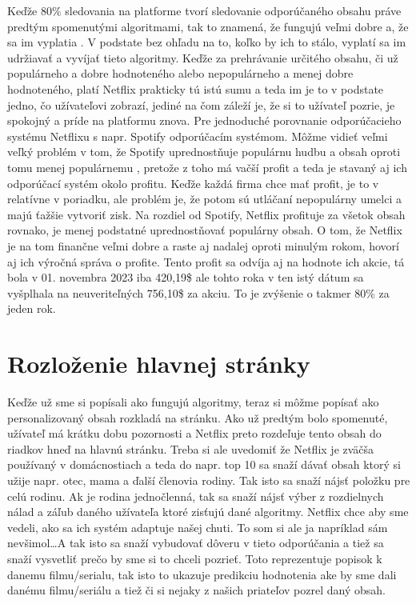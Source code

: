 \documentclass[10pt,twoside,slovak,a4paper]{article}
\begin{document}
Keďže 80\% sledovania na platforme tvorí sledovanie odporúčaného obsahu práve predtým spomenutými algoritmami, tak to znamená, že fungujú veľmi dobre a, že sa im vyplatia \cite{pub.1158091188}. V podstate bez ohľadu na to, koľko by ich to stálo, vyplatí sa im udržiavať a vyvíjať tieto algoritmy. Keďže za prehrávanie určitého obsahu, či už populárneho a dobre hodnoteného alebo nepopulárneho a menej dobre hodnoteného, platí Netflix prakticky tú istú sumu a teda im je to v podstate jedno, čo užívateľovi zobrazí, jediné na čom záleží je, že si to užívateľ pozrie, je spokojný a príde na platformu znova. \cite{amatriain2015recommender}
Pre jednoduché porovnanie odporúčacieho systému Netflixu s napr. Spotify odporúčacím systémom. Môžme vidieť veľmi veľký problém v tom, že Spotify uprednostňuje populárnu hudbu a obsah oproti tomu menej populárnemu , pretože z toho má vačší profit a teda je stavaný aj ich odporúčací systém okolo profitu\cite{10425661}. Keďže každá firma chce mať profit, je to v relatívne v poriadku, ale problém je, že potom sú utláčaní nepopulárny umelci a majú ťažšie vytvoriť zisk. Na rozdiel od Spotify, Netflix profituje za všetok obsah rovnako, je menej podstatné uprednostňovať populárny obsah. O tom, že Netflix je na tom finančne veľmi dobre a raste aj nadalej oproti minulým rokom, hovorí aj ich výročná správa o profite\cite{AnnualReportNetflix2023}. Tento profit sa odvíja aj na hodnote ich akcie, tá bola v 01. novembra 2023 iba 420,19\$ ale tohto roka v ten istý dátum sa vyšplhala na neuveriteľných 756,10\$ za akciu. To je zvýšenie o takmer 80\% za jeden rok.\cite{StockValueNetflix}

\section{Rozloženie hlavnej stránky} \label{Rozloženie}
Keďže už sme si popísali ako fungujú algoritmy, teraz si môžme popísať ako personalizovaný obsah rozkladá na stránku. Ako už predtým bolo spomenuté, užívateľ má krátku dobu pozornosti a Netflix preto rozdeľuje tento obsah do riadkov hneď na hlavnú stránku. Treba si ale uvedomiť že Netflix je zväčša používaný v domácnostiach a teda do napr. top 10 sa snaží dávať obsah ktorý si užije napr. otec, mama a ďalší členovia rodiny. Tak isto sa snaží nájsť položku pre celú rodinu. Ak je rodina jednočlenná, tak sa snaží nájsť výber z rozdielnych nálad a záľub daného užívateľa ktoré zisťujú dané algoritmy.\cite{amatriain2015recommender}
Netflix chce aby sme vedeli, ako sa ich systém adaptuje našej chuti. To som si ale ja napríklad sám nevšimol\ldots A tak isto sa snaží vybudovať dôveru v tieto odporúčania a tiež sa snaží vysvetliť prečo by sme si to chceli pozrieť. Toto reprezentuje popisok k danemu filmu/serialu, tak isto to ukazuje predikciu hodnotenia ake by sme dali danému filmu/seriálu a tiež či si nejaky z našich priateľov pozrel daný obsah.
\end{document}
